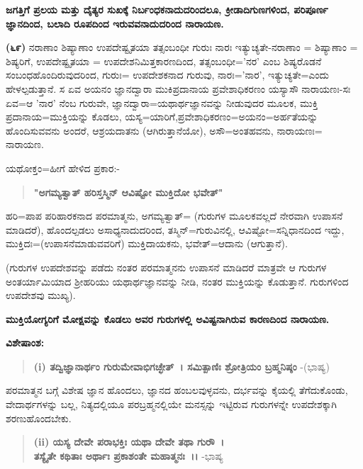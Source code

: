 \begin{center}
\textbf{ಜಗತ್ತಿಗೆ ಪ್ರಲಯ ಮತ್ತು ದೈತ್ಯರ ಸುಖಕ್ಕೆ ನಿರ್ಬಂಧಕನಾದುದರಿಂದಲೂ, ಕ್ರೀಡಾದಿಗುಣಗಳಿಂದ, ಪರಿಪೂರ್ಣ ಜ್ಞಾನದಿಂದ, ಬಲಾದಿ ರೂಪದಿಂದ ಇರುವವನಾದುದರಿಂದ ನಾರಾಯಣ.}
\end{center}

\textbf{(೬೯)} ನರಾಣಾಂ ಶಿಷ್ಯಾಣಾಂ ಉಪದೇಷ್ಟೃತಯಾ ತತ್ಸಂಬಂಧೀ ಗುರುಃ ನಾರಃ ಇತ್ಯು\-ಚ್ಯತೇ-ನರಾಣಾಂ = ಶಿಷ್ಯಾಣಾಂ = ಶಿಷ್ಯರಿಗೆ, ಉಪದೇಷ್ಟೃತಯಾ = ಉಪದೇಶನಿಮಿತ್ತ\break ಕಾರಣ\-ದಿಂದ, ತತ್ಸಂಬಂಧೀ='ನರ' ಎಂಬ ಶಿಷ್ಯರೊಡನೆ ಸಂಬಂಧಹೊಂದಿರುವುದರಿಂದ, ಗುರುಃ= ಉಪದೇಶಕನಾದ ಗುರುವು, ನಾರಃ='ನಾರ', ಇತ್ಯುಚ್ಯತೇ=ಎಂದು ಹೇಳಲ್ಪಡುತ್ತಾನೆ. ಸ ಏವ ಅಯನಂ ಜ್ಞಾನದ್ವಾರಾ ಮುಕಿಪ್ರದಾನಾಯ ಪ್ರವೇಶಾಧಿಕರಣಂ ಯಸ್ಯಾಸೌ ನಾರಾ\-ಯಣಃ-ಸಃ ಏವ=ಆ 'ನಾರ' ನೆಂಬ ಗುರುವೇ, ಜ್ಞಾನದ್ವಾರಾ=ಯಥಾರ್ಥಜ್ಞಾನವನ್ನು ನೀಡು\-ವುದರ ಮೂಲಕ, ಮುಕ್ತಿ ಪ್ರದಾನಾಯ=ಮುಕ್ತಿಯನ್ನು ಕೊಡಲು, ಯಸ್ಯ=ಯಾರಿಗೆ,\break ಪ್ರವೇಶಾಧಿಕರಣಂ=ಅಯನಂ=ಅರ್ಹತೆಯನ್ನು ಹೊಂದಿಸುವವನು ಅಂದರೆ, ಆಶ್ರಯ\break ದಾತನು (ಆಗಿರುತ್ತಾನೆಯೋ), ಅಸೌ=ಅಂತಹವನು, ನಾರಾಯಣಃ= ನಾರಾಯಣ.

ಯಥೋಕ್ತಂ=ಹೀಗೆ ಹೇಳಿದ ಪ್ರಕಾರ:-

\begin{verse}
\textbf{"ಅಗಮ್ಯತ್ವಾತ್ ಹರಿಸ್ತಸ್ಮಿನ್ ಆವಿಷ್ಟೋ ಮುಕ್ತಿದೋ ಭವೇತ್"}
\end{verse}

ಹರಿ=ಪಾಪ ಪರಿಹಾರಕನಾದ ಪರಮಾತ್ಮನು, ಅಗಮ್ಯತ್ವಾತ್= (ಗುರುಗಳ ಮೂಲಕವಲ್ಲದೆ ನೇರವಾಗಿ ಉಪಾಸನೆ ಮಾಡಿದರೆ), ಹೊಂದಲ್ಪಡಲು ಅಸಾಧ್ಯನಾದುದರಿಂದ, ತಸ್ಮಿನ್=ಗುರುವಿನಲ್ಲಿ, ಆವಿಷ್ಟೋ=ಸನ್ನಿಧಾನದಿಂದ ಇದ್ದು, ಮುಕ್ತಿದಃ=(ಉಪಾಸನೆಮಾಡು\-ವವರಿಗೆ) ಮುಕ್ತಿದಾಯಕನು, ಭವೇತ್=ಆದಾನು (ಆಗುತ್ತಾನೆ).

(ಗುರುಗಳ ಉಪದೇಶವನ್ನು ಪಡೆದು ನಂತರ ಪರಮಾತ್ಮನನು ಉಪಾಸನೆ ಮಾಡಿದರೆ ಮಾತ್ರವೇ ಆ ಗುರುಗಳ ಅಂತರ್ಯಾಮಿಯಾದ ಶ‍್ರೀಹರಿಯು ಯಥಾರ್ಥಜ್ಞಾನವನ್ನು ನೀಡಿ, ನಂತರ ಮುಕ್ತಿಯನ್ನು ಕೊಡುತ್ತಾನೆ. ಗುರುಗಳಿಂದ ಉಪದೇಶವು ಮುಖ್ಯ).

\begin{center}
\textbf{ಮುಕ್ತಿಯೋಗ್ಯರಿಗೆ ಮೋಕ್ಷವನ್ನು ಕೊಡಲು ಅವರ ಗುರುಗಳಲ್ಲಿ ಅವಿಷ್ಟನಾಗಿರುವ ಕಾರಣದಿಂದ ನಾರಾಯಣ.}
\end{center}

\noindent
\textbf{ವಿಶೇಷಾಂಶ:\enginline{-}}

\begin{verse}
\textbf{(i) ತದ್ವಿಜ್ಞಾನಾರ್ಥಂ ಗುರುಮೇವಾಭಿಗಚ್ಛೇತ್~। ಸಮಿತ್ಪಾಣಿಃ ಶ್ರೋತ್ರಿಯಂ ಬ್ರಹ್ಮನಿಷ್ಠಂ} -(ಭಾಷ್ಯ)
\end{verse}

ಪರಮಾತ್ಮನ ಬಗ್ಗೆ ವಿಶೇಷ ಜ್ಞಾನ ಹೊಂದಲು, ಜ್ಞಾನದ ಹಂಬಲವುಳ್ಳವನು, ದರ್ಭವನ್ನು ಕೈಯಲ್ಲಿ ತೆಗೆದುಕೊಂಡು, ವೇದಾರ್ಥಗಳನ್ನು ಬಲ್ಲ, ನಿತ್ಯದಲ್ಲಿಯೂ ಪರಬ್ರಹ್ಮನಲ್ಲಿಯೇ ಮನಸ್ಸನ್ನು ಇಟ್ಟಿರುವ ಗುರುಗಳನ್ನೇ ಉಪದೇಶಕ್ಕಾಗಿ ಶರಣುಹೊಂದಬೇಕು.

\begin{verse}
\textbf{(ii) ಯಸ್ಯ ದೇವೇ ಪರಾಭಕ್ತಿಃ ಯಥಾ ದೇವೇ ತಥಾ ಗುರೌ~।}\\\textbf{ತಸ್ಯೈತೇ ಕಥಿತಾಃ ಅರ್ಥಾಃ ಪ್ರಕಾಶಂತೇ ಮಹಾತ್ಮನಃ~।।} -ಭಾಷ್ಯ
\end{verse}

